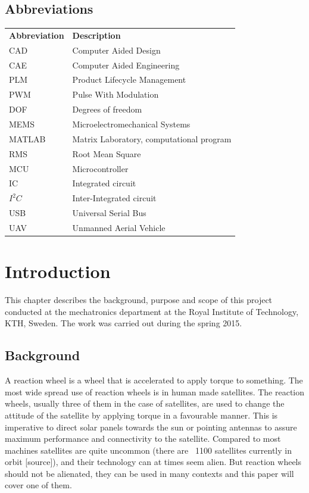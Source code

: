 \documentclass[a4paper,11pt]{kth-mag}
\begin{document}
\section*{Abbreviations}
\noindent{}\begin{tabular}{@{}p{2.5cm}l}
\textbf{Abbreviation} 	& \textbf{Description} \vspace{.5em} \\
CAD			& Computer Aided Design \\
CAE			& Computer Aided Engineering\\
PLM			& Product Lifecycle Management\\
PWM			& Pulse With Modulation\\
DOF			& Degrees of freedom\\
MEMS			& Microelectromechanical Systems \\
MATLAB		& Matrix Laboratory, computational program\\
RMS			& Root Mean Square\\
MCU			& Microcontroller\\
IC			& Integrated circuit\\
$I^2C$		& Inter-Integrated circuit\\
USB			& Universal Serial Bus \\
UAV			& Unmanned Aerial Vehicle\\
\end{tabular}
\cleardoublepage

\mainmatter
\pagestyle{newchap}

\chapter{Introduction}
This chapter describes the background, purpose and scope of this project conducted at the mechatronics department at the Royal Institute of Technology, KTH, Sweden. The work was carried out during the spring 2015.

\section{Background}
A reaction wheel is a wheel that is accelerated to apply torque to something. The most wide spread use of reaction wheels is in human made satellites. The  reaction wheels, usually three of them in the case of satellites, are used to change the attitude of the satellite by applying torque in a favourable manner. This is imperative to direct solar panels towards the sun or pointing antennas to assure maximum performance and connectivity to the satellite. Compared to most machines satellites are quite uncommon (there are ~1100 satellites currently in orbit [source]), and their technology can at times seem alien. But reaction wheels should not be alienated, they can be used in many contexts and this paper will cover one of them.  
\end{document}
